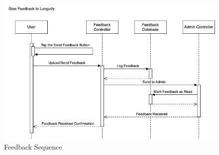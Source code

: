 \begin{figure}[H]
	\centering
	\includegraphics[width=\textwidth, height=\textheight, keepaspectratio]{Section3/images/GiveFeedbackLanguifySequenceDiagram.drawio.png}
	\caption{Feedback Sequence}
	\label{FeedbackSequence}
\end{figure}